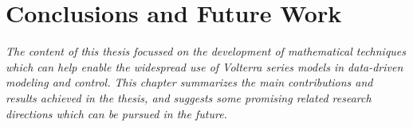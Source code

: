 \documentclass[11pt,twoside]{report}
\begin{document}
\cleardoublepage
{}%
\chapter{Conclusions and Future Work}
\label{chap:12}
\emph{The content of this thesis focussed on the development of mathematical techniques which can help enable the widespread use of Volterra series models in data-driven modeling and control. This chapter summarizes the main contributions and results achieved in the thesis, and suggests some promising related research directions which can be pursued in the future.}
\newpage


\cleardoublepage
{}
{}


\end{document}
